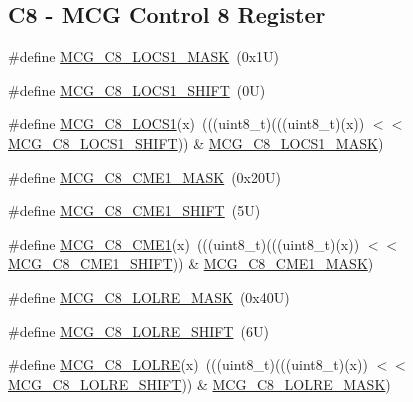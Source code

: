 \subsection*{C8 -\/ M\+CG Control 8 Register}
\begin{DoxyCompactItemize}
\item 
\#define \mbox{\hyperlink{group___m_c_g___register___masks_ga1417ca27a647ced3cdfc504a604f8dc8}{M\+C\+G\+\_\+\+C8\+\_\+\+L\+O\+C\+S1\+\_\+\+M\+A\+SK}}~(0x1\+U)
\item 
\#define \mbox{\hyperlink{group___m_c_g___register___masks_ga648e426b4d1f976cca5229505a26d9a8}{M\+C\+G\+\_\+\+C8\+\_\+\+L\+O\+C\+S1\+\_\+\+S\+H\+I\+FT}}~(0\+U)
\item 
\#define \mbox{\hyperlink{group___m_c_g___register___masks_ga8bbb08b76cef66c7b8dd85f944284815}{M\+C\+G\+\_\+\+C8\+\_\+\+L\+O\+C\+S1}}(x)~(((uint8\+\_\+t)(((uint8\+\_\+t)(x)) $<$$<$ \mbox{\hyperlink{group___m_c_g___register___masks_ga648e426b4d1f976cca5229505a26d9a8}{M\+C\+G\+\_\+\+C8\+\_\+\+L\+O\+C\+S1\+\_\+\+S\+H\+I\+FT}})) \& \mbox{\hyperlink{group___m_c_g___register___masks_ga1417ca27a647ced3cdfc504a604f8dc8}{M\+C\+G\+\_\+\+C8\+\_\+\+L\+O\+C\+S1\+\_\+\+M\+A\+SK}})
\item 
\#define \mbox{\hyperlink{group___m_c_g___register___masks_ga9e0e0db74d7e18fffad7b4f08eb74524}{M\+C\+G\+\_\+\+C8\+\_\+\+C\+M\+E1\+\_\+\+M\+A\+SK}}~(0x20\+U)
\item 
\#define \mbox{\hyperlink{group___m_c_g___register___masks_ga00dc55bd1e2197897d59597dd57592ba}{M\+C\+G\+\_\+\+C8\+\_\+\+C\+M\+E1\+\_\+\+S\+H\+I\+FT}}~(5\+U)
\item 
\#define \mbox{\hyperlink{group___m_c_g___register___masks_gacfd4bf40d2ff518561d54938851479ef}{M\+C\+G\+\_\+\+C8\+\_\+\+C\+M\+E1}}(x)~(((uint8\+\_\+t)(((uint8\+\_\+t)(x)) $<$$<$ \mbox{\hyperlink{group___m_c_g___register___masks_ga00dc55bd1e2197897d59597dd57592ba}{M\+C\+G\+\_\+\+C8\+\_\+\+C\+M\+E1\+\_\+\+S\+H\+I\+FT}})) \& \mbox{\hyperlink{group___m_c_g___register___masks_ga9e0e0db74d7e18fffad7b4f08eb74524}{M\+C\+G\+\_\+\+C8\+\_\+\+C\+M\+E1\+\_\+\+M\+A\+SK}})
\item 
\#define \mbox{\hyperlink{group___m_c_g___register___masks_gaeab391a933aec2eeb1ffdbc772f714e2}{M\+C\+G\+\_\+\+C8\+\_\+\+L\+O\+L\+R\+E\+\_\+\+M\+A\+SK}}~(0x40\+U)
\item 
\#define \mbox{\hyperlink{group___m_c_g___register___masks_ga247e347342c951c4b8044bece01311fb}{M\+C\+G\+\_\+\+C8\+\_\+\+L\+O\+L\+R\+E\+\_\+\+S\+H\+I\+FT}}~(6\+U)
\item 
\#define \mbox{\hyperlink{group___m_c_g___register___masks_ga882f76d0b8c7e3045f2df6369cc794d1}{M\+C\+G\+\_\+\+C8\+\_\+\+L\+O\+L\+RE}}(x)~(((uint8\+\_\+t)(((uint8\+\_\+t)(x)) $<$$<$ \mbox{\hyperlink{group___m_c_g___register___masks_ga247e347342c951c4b8044bece01311fb}{M\+C\+G\+\_\+\+C8\+\_\+\+L\+O\+L\+R\+E\+\_\+\+S\+H\+I\+FT}})) \& \mbox{\hyperlink{group___m_c_g___register___masks_gaeab391a933aec2eeb1ffdbc772f714e2}{M\+C\+G\+\_\+\+C8\+\_\+\+L\+O\+L\+R\+E\+\_\+\+M\+A\+SK}})
$$
\end{DoxyCompactItemize}
